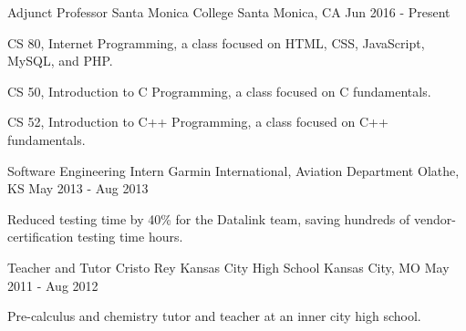 


\begin{cventries}


\cventry
{Adjunct Professor}
{Santa Monica College}
{Santa Monica, CA}
{Jun 2016 - Present}
{
\begin{cvitems}
\item CS 80, Internet Programming, a class focused on HTML, CSS, JavaScript, MySQL, and PHP.
\item CS 50, Introduction to C Programming, a class focused on C fundamentals.
\item CS 52, Introduction to C++ Programming, a class focused on C++ fundamentals.
\end{cvitems}
}


\cventry
{Software Engineering Intern}
{Garmin International, Aviation Department}
{Olathe, KS}
{May 2013 - Aug 2013}
{
\begin{cvitems}
\item Reduced testing time by 40\% for the Datalink team, saving hundreds of vendor-certification testing time hours.
\end{cvitems}
}


\cventry
{Teacher and Tutor}
{Cristo Rey Kansas City High School}
{Kansas City, MO}
{May 2011 - Aug 2012}
{
\begin{cvitems}
\item Pre-calculus and chemistry tutor and teacher at an inner city high school.
\end{cvitems}
}

\end{cventries}